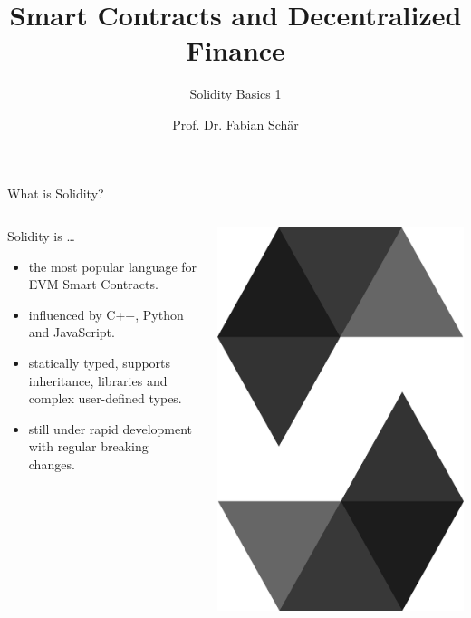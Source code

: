 \documentclass[handout]{beamer}
\title{Smart Contracts and Decentralized Finance}
\subtitle{Solidity Basics 1}
\author{Prof. Dr. Fabian Schär}
\institute{University of Basel}
\begin{document}
\thispagestyle{empty}
\begin{frame}[noframenumbering]
	\titlepage
\end{frame}

\begin{frame}{What is Solidity?}

\begin{columns}[T]
	\begin{column}{0.7\textwidth}
		Solidity is \dots
			\begin{itemize}
			\item<1-> the most popular language for EVM Smart Contracts.
				\item<2-> influenced by C++, Python and JavaScript.
				\item<3-> statically typed, supports inheritance, libraries and complex user-defined types.
				\item<4-> still under rapid development with regular breaking changes.
			\end{itemize}
	\end{column}
	\begin{column}{0.3\textwidth}
	\center
			\includegraphics[scale=0.04]{../assets/images/solidity_logo_new}
	\end{column}
\end{columns}	


\end{frame}
\end{document}

